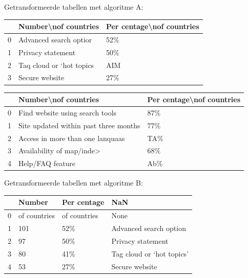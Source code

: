 Getransformeerde tabellen met algoritme A:

\begin{tabular}{lll}
\toprule
{} &      Number\textbackslash nof countries & Per centage\textbackslash nof countries \\
\midrule
0 &    Advanced search optior &                       52\% \\
1 &         Privacy statement &                       50\% \\
2 &  Taq cloud or ‘hot topics &                       AIM \\
3 &            Secure website &                       27\% \\
\bottomrule
\end{tabular}

\begin{tabular}{lll}
\toprule
{} &                   Number\textbackslash nof countries & Per centage\textbackslash nof countries \\
\midrule
0 &        Find website using search tools &                       87\% \\
1 &  Site updated within past three months &                       77\% \\
2 &       Access in more than one lanquaas &                       TA\% \\
3 &              Availability of map/inde> &                       68\% \\
4 &                       Help/FAQ feature &                       Ab\% \\
\bottomrule
\end{tabular}

Getransformeerde tabellen met algoritme B:

\begin{tabular}{llll}
\toprule
{} &        Number &   Per centage &                        NaN \\
\midrule
0 &  of countries &  of countries &                       None \\
1 &           101 &           52\% &     Advanced search option \\
2 &            97 &           50\% &          Privacy statement \\
3 &            80 &           41\% &  Tag cloud or ‘hot topics’ \\
4 &            53 &           27\% &             Secure website \\
\bottomrule
\end{tabular}

